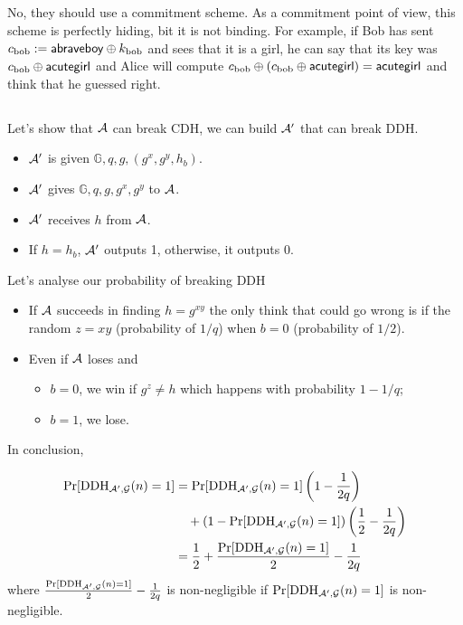 \subsection{}
\begin{solution}
  No, they should use a commitment scheme.
  As a commitment point of view, this scheme is perfectly hiding, bit it is not binding.
  For example, if Bob has sent $c_{\text{bob}} := \mathsf{abraveboy} \oplus k_{\text{bob}}$ and sees that it is a girl,
  he can say that its key was $c_{\text{bob}} \oplus \mathsf{acutegirl}$ and Alice will
  compute $c_{\text{bob}} \oplus (c_{\text{bob}} \oplus \mathsf{acutegirl}) = \mathsf{acutegirl}$ and think that he guessed right.
\end{solution}

\subsection{}
\begin{solution}
  Let's show that $\mathcal{A}$ can break CDH, we can build $\mathcal{A}'$ that can break DDH.
  \begin{itemize}
    \item $\mathcal{A}'$ is given $\mathbb{G}, q, g, (g^x, g^y, h_b)$.
    \item $\mathcal{A}'$ gives $\mathbb{G}, q, g, g^x, g^y$ to $\mathcal{A}$.
    \item $\mathcal{A}'$ receives $h$ from $\mathcal{A}$.
    \item If $h = h_b$, $\mathcal{A}'$ outputs 1, otherwise, it outputs 0.
  \end{itemize}
  Let's analyse our probability of breaking DDH
  \begin{itemize}
    \item
      If $\mathcal{A}$ succeeds in finding $h = g^{xy}$ the only think that could go wrong
      is if the random $z = xy$ (probability of $1/q$) when $b = 0$ (probability of $1/2$).
    \item
      Even if $\mathcal{A}$ loses and
      \begin{itemize}
        \item $b = 0$, we win if $g^z \neq h$ which happens with probability $1-1/q$;
        \item $b = 1$, we lose.
      \end{itemize}
  \end{itemize}
  In conclusion,

  \begin{align*}
    \Pr[\operatorname{DDH}_{\mathcal{A}',\mathcal{G}}(n) = 1]
    & = \Pr[\operatorname{DDH}_{\mathcal{A}',\mathcal{G}}(n) = 1]\left(1 - \frac{1}{2q}\right)\\
    & \quad + (1 - \Pr[\operatorname{DDH}_{\mathcal{A}',\mathcal{G}}(n) = 1])\left(\frac{1}{2}-\frac{1}{2q}\right)\\
    & = \frac{1}{2} + \frac{\Pr[\operatorname{DDH}_{\mathcal{A}',\mathcal{G}}(n) = 1]}{2} - \frac{1}{2q}
  \end{align*}
  where $\frac{\Pr[\operatorname{DDH}_{\mathcal{A}',\mathcal{G}}(n) = 1]}{2} - \frac{1}{2q}$ is non-negligible if $\Pr[\operatorname{DDH}_{\mathcal{A}',\mathcal{G}}(n) = 1]$
  is non-negligible.
\end{solution}
